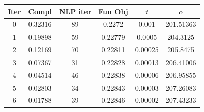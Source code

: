 \begin{tabular}{c c c c c c}
\toprule
Iter & Compl & NLP iter & Fun Obj & $t$ & $\alpha$ \\
\midrule
0 & 0.32316 & 89 & 0.2272 & 0.001 & 201.51363 \\
1 & 0.19898 & 59 & 0.22779 & 0.0005 & 204.3125 \\
2 & 0.12169 & 70 & 0.22811 & 0.00025 & 205.8475 \\
3 & 0.07367 & 31 & 0.22828 & 0.00013 & 206.41006 \\
4 & 0.04514 & 46 & 0.22838 & 0.00006 & 206.95855 \\
5 & 0.02803 & 34 & 0.22843 & 0.00003 & 207.26083 \\
6 & 0.01788 & 39 & 0.22846 & 0.00002 & 207.43233 \\
\bottomrule
\end{tabular}